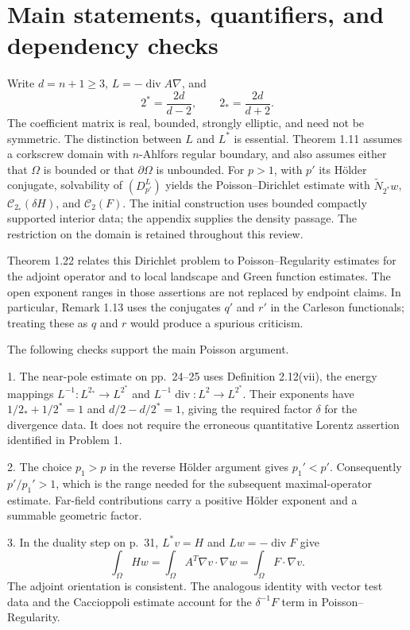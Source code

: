 \documentclass[10pt]{article}
\begin{document}
\section*{Main statements, quantifiers, and dependency checks}
Write \(d=n+1\geq3\), \(L=-\mathop{\mathrm{div}}A\nabla\), and \[2^*=\frac{2d}{d-2},\qquad 2_*=\frac{2d}{d+2}.\] The coefficient matrix is real, bounded, strongly elliptic, and need not be symmetric. The distinction between \(L\) and \(L^*\) is essential. Theorem 1.11 assumes a corkscrew domain with \(n\)-Ahlfors regular boundary, and also assumes either that \(\Omega\) is bounded or that \(\partial\Omega\) is unbounded. For \(p>1\), with \(p'\) its Hölder conjugate, solvability of \((D^L_{p'})\) yields the Poisson–Dirichlet estimate with \(\widetilde N_{2^*}w\), \(\mathcal C_{2_*}(\delta H)\), and \(\mathcal C_2(F)\). The initial construction uses bounded compactly supported interior data; the appendix supplies the density passage. The restriction on the domain is retained throughout this review.\par
Theorem 1.22 relates this Dirichlet problem to Poisson–Regularity estimates for the adjoint operator and to local landscape and Green function estimates. The open exponent ranges in those assertions are not replaced by endpoint claims. In particular, Remark 1.13 uses the conjugates \(q'\) and \(r'\) in the Carleson functionals; treating these as \(q\) and \(r\) would produce a spurious criticism.\par
The following checks support the main Poisson argument.\par
1. The near-pole estimate on pp. 24–25 uses Definition 2.12(vii), the energy mappings \(L^{-1}:L^{2_*}\to L^{2^*}\) and \(L^{-1}\mathop{\mathrm{div}}:L^2\to L^{2^*}\). Their exponents have \(1/2_*+1/2^*=1\) and \(d/2-d/2^*=1\), giving the required factor \(\delta\) for the divergence data. It does not require the erroneous quantitative Lorentz assertion identified in Problem 1.\par
2. The choice \(p_1>p\) in the reverse Hölder argument gives \(p_1'<p'\). Consequently \(p'/p_1'>1\), which is the range needed for the subsequent maximal-operator estimate. Far-field contributions carry a positive Hölder exponent and a summable geometric factor.\par
3. In the duality step on p. 31, \(L^*v=H\) and \(Lw=-\mathop{\mathrm{div}}F\) give \[\int_\Omega Hw=\int_\Omega A^T\nabla v\cdot\nabla w
            =\int_\Omega F\cdot\nabla v.\] The adjoint orientation is consistent. The analogous identity with vector test data and the Caccioppoli estimate account for the \(\delta^{-1}F\) term in Poisson–Regularity.\par
\end{document}
